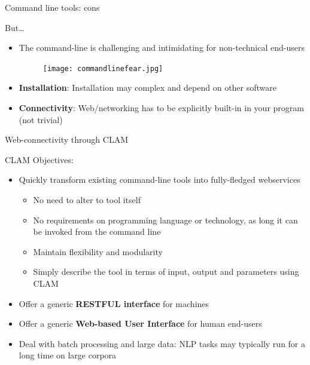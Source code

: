 \documentclass[xcolor=table,10pt,t]{beamer}
\begin{document}
\begin{frame}{Command line tools: cons}
  \begin{block}{But\ldots}
      \begin{itemize}
        \item The command-line is challenging and intimidating for non-technical end-users
        \begin{figure}
            \texttt{[image: commandlinefear.jpg]}
        \end{figure}
        \item<2-> \textbf{Installation}: Installation may complex and depend on other software
        \item<2-> \textbf{Connectivity}: Web/networking has to be explicitly built-in in your program (not trivial)
      \end{itemize}
  \end{block}
\end{frame}

\begin{frame}{Web-connectivity through CLAM}
  \begin{block}{CLAM}
      Objectives:
      \begin{itemize}
        \item Quickly transform existing command-line tools into fully-fledged webservices
        \begin{itemize}
            \item No need to alter to tool itself
            \item No requirements on programming language or technology, as
                long it can be invoked from the command line
            \item Maintain flexibility and modularity
            \item Simply describe the tool in terms of input, output and
                parameters using CLAM
        \end{itemize}
        \item Offer a generic \textbf{RESTFUL interface} for machines
        \item Offer a generic \textbf{Web-based User Interface} for human end-users
        \item Deal with batch processing and large data: NLP tasks may typically run for a
            long time on large corpora
      \end{itemize}
  \end{block}
\end{frame}
\end{document}
